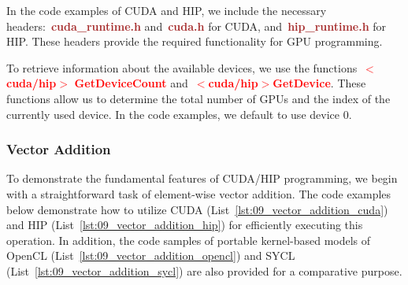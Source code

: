 


\par
In the code examples of CUDA and HIP, we include the necessary headers:~\textbf{\textcolor{brown}{cuda\_runtime.h}} and~\textbf{\textcolor{brown}{cuda.h}} for CUDA, and~\textbf{\textcolor{brown}{hip\_runtime.h}} for HIP.
These headers provide the required functionality for GPU programming.


\par
To retrieve information about the available devices, we use the functions~\textbf{\textcolor{red}{$<$cuda/hip$>$}} \textbf{\textcolor{red}{GetDeviceCount}} and~\textbf{\textcolor{red}{$<$cuda/hip$>$GetDevice}}.
These functions allow us to determine the total number of GPUs and the index of the currently used device.
In the code examples, we default to use device 0.


\subsubsection{Vector Addition}\label{sec:vector_addition}


\par
To demonstrate the fundamental features of CUDA/HIP programming, we begin with a straightforward task of element-wise vector addition.
The code examples below demonstrate how to utilize CUDA (List~\ref{lst:09_vector_addition_cuda}) and HIP (List~\ref{lst:09_vector_addition_hip}) for efficiently executing this operation.
In addition, the code samples of portable kernel-based models of OpenCL (List~\ref{lst:09_vector_addition_opencl}) and SYCL (List~\ref{lst:09_vector_addition_sycl}) are also provided for a comparative purpose.











